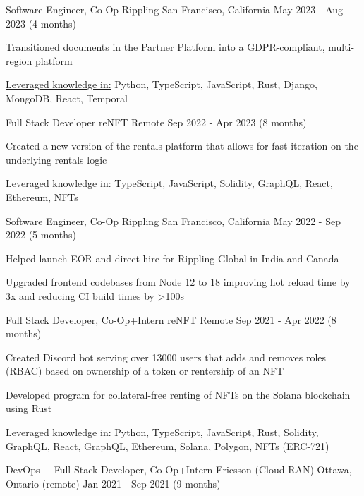 \begin{cventries}
	\cventry
	{Software Engineer, Co-Op}
	{Rippling}
	{San Francisco, California}
	{May 2023 - Aug 2023 (4 months)}
	{
		\begin{cvitems}
			\item{Transitioned documents in the Partner Platform into a GDPR-compliant, multi-region platform}
			\item{\underline{Leveraged knowledge in:} Python, TypeScript, JavaScript, Rust, Django, MongoDB, React, Temporal}
		\end{cvitems}
	}
	\cventry
	{Full Stack Developer}
	{reNFT}
	{Remote}
	{Sep 2022 - Apr 2023 (8 months)}
	{
		\begin{cvitems}
			\item{Created a new version of the rentals platform that allows for fast iteration on the underlying rentals logic}
			\item{\underline{Leveraged knowledge in:} TypeScript, JavaScript, Solidity, GraphQL, React, Ethereum, NFTs}
		\end{cvitems}
	}
	\cventry
	{Software Engineer, Co-Op}
	{Rippling}
	{San Francisco, California}
	{May 2022 - Sep 2022 (5 months)}
	{
		\begin{cvitems}
			\item{Helped launch EOR and direct hire for Rippling Global in India and Canada}
			\item{Upgraded frontend codebases from Node 12 to 18 improving hot reload time by 3x and reducing CI build times by >100s}
		\end{cvitems}
	}
	\cventry
	{Full Stack Developer, Co-Op+Intern}
	{reNFT}
	{Remote}
	{Sep 2021 - Apr 2022 (8 months)}
	{
		\begin{cvitems}
			\item{Created Discord bot serving over 13000 users that adds and removes roles (RBAC) based on ownership of a token or rentership of an NFT}
			\item{Developed program for collateral-free renting of NFTs on the Solana blockchain using Rust}
			\item{\underline{Leveraged knowledge in:} Python, TypeScript, JavaScript, Rust, Solidity, GraphQL, React, GraphQL, Ethereum, Solana, Polygon, NFTs (ERC-721)}
		\end{cvitems}
	}
	\cventry
	{DevOps + Full Stack Developer, Co-Op+Intern}
	{Ericsson (Cloud RAN)}
	{Ottawa, Ontario (remote)}
	{Jan 2021 - Sep 2021 (9 months)}
	{
		\begin{cvitems}

\end{cvitems}}
\end{cventries}

